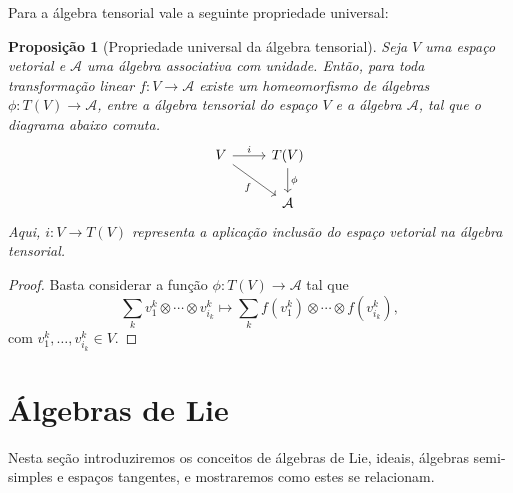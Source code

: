 \documentclass[twoside,openright,titlepage,numbers=noenddot,headinclude,  lineheaders footinclude=true,cleardoublepage=empty,
                                BCOR=5mm,paper=a4,fontsize=12pt ]{scrbook}
\newtheorem{prop}[teo]{Proposição}
\theoremstyle{definition}
\begin{document}
Para a álgebra tensorial vale a seguinte propriedade universal:
\begin{prop}[Propriedade universal da álgebra tensorial] \label{propUniv}
Seja $V$ uma espaço vetorial e $\mathcal{A}$ uma álgebra associativa com unidade.
Então, para toda transformação linear $f: V \rightarrow \mathcal{A}$ existe um homeomorfismo 
de álgebras 
$\phi: T(V) \rightarrow \mathcal{A}$,
entre a álgebra tensorial do espaço $V$ e a álgebra $\mathcal{A}$, tal que o diagrama abaixo comuta.
\begin{displaymath}
\begin{tikzcd}
    V \arrow[swap]{rd }{f} \arrow{r}{ i} & T(V) \arrow{d} {\phi} \\
    & \mathcal{A}
\end{tikzcd}
\end{displaymath}
Aqui, $i: V \rightarrow T(V)$ representa a aplicação inclusão do espaço vetorial na álgebra tensorial.
\end{prop}

\begin{proof}
Basta considerar a função $\phi: T(V) \rightarrow \mathcal{A}$ tal que 
\[\sum_k v_1^k\otimes \cdots \otimes v_{i_k}^k \mapsto \sum_k f(v_1^k)\otimes \cdots \otimes f(v_{i_k}^k),\]
com $v_1^k, \ldots, v_{i_k}^k \in V$.
\end{proof}




\section{\'Algebras de Lie}
Nesta seção introduziremos os conceitos de álgebras de Lie, ideais, álgebras semi-simples e espaços tangentes, e 
mostraremos como estes se relacionam.
\end{document}
